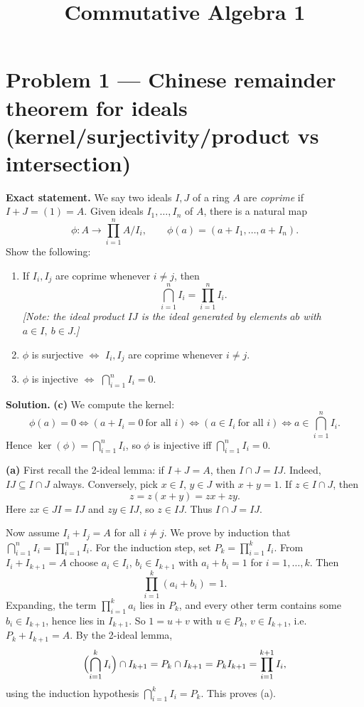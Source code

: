 \documentclass[12pt,a4paper]{article}
\title{Commutative Algebra 1}
\author{}
\date{}
\theoremstyle{plain}
\theoremstyle{definition}      %
\begin{document}
	\maketitle
	
	
	\section*{Problem 1 — Chinese remainder theorem for ideals (kernel/surjectivity/product vs intersection)}
	
	\textbf{Exact statement.}
	We say two ideals \(I,J\) of a ring \(A\) are \emph{coprime} if \(I+J=(1)=A\).
	Given ideals \(I_1,\dots,I_n\) of \(A\), there is a natural map
	\[
	\phi: A \longrightarrow \prod_{i=1}^n A/I_i,
	\qquad
	\phi(a)=(a+I_1,\dots,a+I_n).
	\]
	Show the following:
	\begin{enumerate}
		\item[(a)] If \(I_i,I_j\) are coprime whenever \(i\neq j\), then
		\[
		\bigcap_{i=1}^n I_i=\prod_{i=1}^n I_i.
		\]
		\emph{[Note: the ideal product \(IJ\) is the ideal generated by elements \(ab\) with \(a\in I,\ b\in J\).]}
		\item[(b)] \(\phi\) is surjective \(\Longleftrightarrow\) \(I_i,I_j\) are coprime whenever \(i\neq j\).
		\item[(c)] \(\phi\) is injective \(\Longleftrightarrow\) \(\bigcap_{i=1}^n I_i=0\).
	\end{enumerate}
	
	\textbf{Solution.}
	\textbf{(c)} We compute the kernel:
	\[
	\phi(a)=0 \iff (a+I_i=0\ \text{for all }i)\iff (a\in I_i\ \text{for all }i)
	\iff a\in \bigcap_{i=1}^n I_i.
	\]
	Hence \(\ker(\phi)=\bigcap_{i=1}^n I_i\), so \(\phi\) is injective iff \(\bigcap_{i=1}^n I_i=0\).
	
	\medskip
	\textbf{(a)} First recall the 2-ideal lemma: if \(I+J=A\), then \(I\cap J=IJ\).
	Indeed, \(IJ\subseteq I\cap J\) always. Conversely, pick \(x\in I\), \(y\in J\) with \(x+y=1\).
	If \(z\in I\cap J\), then
	\[
	z=z(x+y)=zx+zy.
	\]
	Here \(zx\in JI=IJ\) and \(zy\in IJ\), so \(z\in IJ\). Thus \(I\cap J=IJ\).
	
	Now assume \(I_i+I_j=A\) for all \(i\neq j\). We prove by induction that
	\(\bigcap_{i=1}^n I_i=\prod_{i=1}^n I_i\).
	For the induction step, set \(P_k=\prod_{i=1}^k I_i\).
	From \(I_i+I_{k+1}=A\) choose \(a_i\in I_i\), \(b_i\in I_{k+1}\) with \(a_i+b_i=1\) for \(i=1,\dots,k\).
	Then
	\[
	\prod_{i=1}^k (a_i+b_i)=1.
	\]
	Expanding, the term \(\prod_{i=1}^k a_i\) lies in \(P_k\), and every other term contains some \(b_i\in I_{k+1}\),
	hence lies in \(I_{k+1}\). So \(1=u+v\) with \(u\in P_k\), \(v\in I_{k+1}\), i.e. \(P_k+I_{k+1}=A\).
	By the 2-ideal lemma,
	\[
	\Bigl(\bigcap_{i=1}^k I_i\Bigr)\cap I_{k+1}
	= P_k \cap I_{k+1}
	= P_k I_{k+1}
	= \prod_{i=1}^{k+1} I_i,
	\]
	using the induction hypothesis \(\bigcap_{i=1}^k I_i=P_k\). This proves (a).
	
\end{document}
